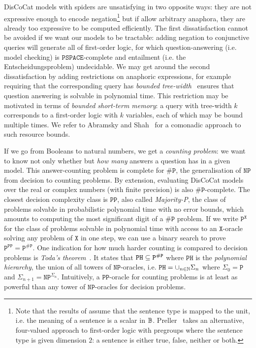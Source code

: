 DisCoCat models with spiders are unsatisfying in two opposite ways: they are not expressive enough to encode negation\footnote
{Note that the results of \cite{FeliceEtAl19} assume that the sentence type is mapped to the unit, i.e. the meaning of a sentence is a scalar in $\mathbb{B}$.
Preller~\cite{Preller14a,Preller14} takes an alternative, four-valued approach to first-order logic with pregroups where the sentence type is given dimension $2$: a sentence is either true, false, neither or both.}
but if allow arbitrary anaphora, they are already too expressive to be computed efficiently.
The first dissatisfaction cannot be avoided if we want our models to be tractable: adding negation to conjunctive queries will generate all of first-order logic, for which question-answering (i.e. model checking) is $\mathtt{PSPACE}$-complete and entailment (i.e. the Entscheidungsproblem) undecidable.
We may get around the second dissatisfaction by adding restrictions on anaphoric expressions, for example requiring that the corresponding query has \emph{bounded tree-width}~\cite{ChekuriRajaraman00} ensures that question answering is solvable in polynomial time.
This restriction may be motivated in terms of \emph{bounded short-term memory}: a query with tree-width $k$ corresponds to a first-order logic with $k$ variables, each of which may be bound multiple times.
We refer to Abramsky and Shah~\cite{AbramskyShah18} for a comonadic approach to such resource bounds.

If we go from Booleans to natural numbers, we get a \emph{counting problem}: we want to know not only whether but \emph{how many} answers a question has in a given model.
This answer-counting problem is complete for $\mathtt{\#P}$, the generalisation of $\mathtt{NP}$ from decision to counting problems.
By extension, evaluating DisCoCat models over the real or complex numbers (with finite precision) is also $\mathtt{\#P}$-complete.
The closest decision complexity class is $\mathtt{PP}$, also called \emph{Majority-P}, the class of problems solvable in probabilistic polynomial time with no error bounds, which amounts to computing the most significant digit of a $\mathtt{\#P}$ problem.
If we write $\mathtt{P}^\mathtt{X}$ for the class of problems solvable in polynomial time with access to an $\mathtt{X}$-oracle solving any problem of $\mathtt{X}$ in one step, we can use a binary search to prove $\mathtt{P}^\mathtt{PP} = \mathtt{P}^\mathtt{\#P}$.
One indication for how much harder counting is compared to decision problems is \emph{Toda's theorem}~\cite{Toda91}.
It states that $\mathtt{PH} \subseteq \mathtt{P}^\mathtt{\#P}$ where $\mathtt{PH}$ is the \emph{polynomial hierarchy}, the union of all towers of $\mathtt{NP}$-oracles, i.e. $\mathtt{PH} = \cup_{n \in \mathbb{N}} \Sigma_n$ where $\Sigma_0 = \mathtt{P}$ and $\Sigma_{n + 1} = \mathtt{NP}^{\Sigma_n}$.
Intuitively, a $\mathtt{PP}$-oracle for counting problems is at least as powerful than any tower of $\mathtt{NP}$-oracles for decision problems.


